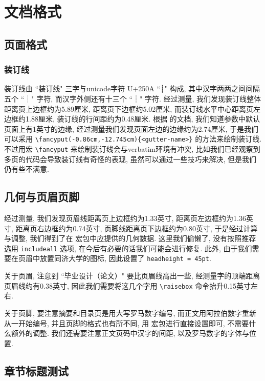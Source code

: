 
\section{文档格式}

\subsection{页面格式}

\subsubsection{装订线}

装订线由 ``装订线" 三字与unicode字符 U+250A ``┊" 构成, 其中汉字两两之间间隔五个 ``┊" 字符, 而汉字外侧还有十三个 ``┊" 字符. 经过测量, 我们发现装订线整体距离页上边框约为5.89厘米, 距离页下边框约5.02厘米, 而装订线水平中心距离页左边框约1.88厘米, 装订线的行间距约为0.48厘米. 根据  的文档, 我们知道参数中默认页面上有1英寸的边缘, 经过测量我们发现页面左边的边缘约为2.74厘米, 于是我们可以采用 \verb|\fancyput(-0.86cm,-12.745cm){<gutter-name>}| 的方法来绘制装订线. 不过用宏 \verb|\fancyput| 来绘制装订线会与verbatim环境有冲突, 比如我们已经观察到多页的代码会导致装订线有奇怪的表现, 虽然可以通过一些技巧来解决, 但是我们仍有些不满意.

\subsection{几何与页眉页脚}

经过测量, 我们发现页眉线距离页上边框约为1.33英寸, 距离页左边框约为1.36英寸, 距离页右边框约为0.74英寸, 页脚线距离页下边框约为0.80英寸, 于是经过计算与调整, 我们得到了在  宏包中应提供的几何数据. 这里我们偷懒了, 没有按照推荐选用 \verb|includeall| 选项, 在今后有必要的话我们可能会进行修复. 此外, 由于我们需要在页眉中放置同济大学的图标, 因此设置了 \verb|headheight = 45pt|.

关于页眉, 注意到 ``毕业设计（论文）" 要比页眉线高出一些, 经测量字的顶端距离页眉线约有0.38英寸, 因此我们需要将这几个字用 \verb|\raisebox| 命令抬升0.15英寸左右.

关于页脚, 要注意摘要和目录页是用大写罗马数字编号, 而正文用阿拉伯数字重新从一开始编号, 并且页脚的格式也有所不同, 用  宏包进行直接设置即可, 不需要什么额外的调整. 我们还需要注意正文页码中汉字的间距, 以及罗马数字的字体与位置.%

\subsection{章节标题测试}

